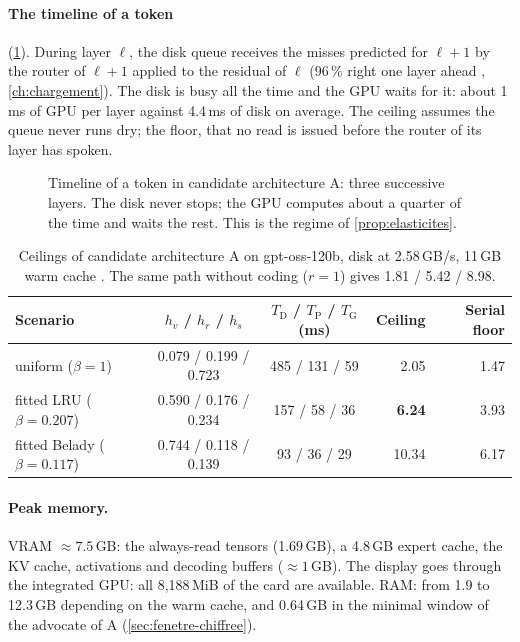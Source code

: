 \paragraph{The timeline of a token} (\cref{fig:chrono-a}). During layer $\ell$, the disk queue receives the misses predicted for $\ell+1$ by the router of $\ell+1$ applied to the residual of $\ell$ (96\,\% right one layer ahead \litt, \cref{ch:chargement}). The disk is busy all the time and the GPU waits for it: about 1\,ms of GPU per layer against 4.4\,ms of disk on average. The ceiling assumes the queue never runs dry; the floor, that no read is issued before the router of its layer has spoken.

\begin{figure}[ht]
\centering
\SchemaChronoA
\caption[Timeline of a token in A]{Timeline of a token in candidate architecture A: three successive layers. The disk never stops; the GPU computes about a quarter of the time and waits the rest. This is the regime of \cref{prop:elasticites}.}
\label{fig:chrono-a}
\end{figure}

\begin{table}[ht]
\centering\small
\caption[Ceilings of A]{Ceilings of candidate architecture A on gpt-oss-120b, disk at 2.58\,GB/s, 11\,GB warm cache \calc. The same path without coding ($r = 1$) gives 1.81 / 5.42 / 8.98.}
\label{tab:plafonds-a}
\begin{tabular}{@{}lccrr@{}}
\toprule
Scenario & $h_v$ / $h_r$ / $h_s$ & $T_{\mathrm{D}}$ / $T_{\mathrm{P}}$ / $T_{\mathrm{G}}$ (ms) & Ceiling & Serial floor \\
\midrule
uniform ($\beta = 1$) & 0.079 / 0.199 / 0.723 & 485 / 131 / 59 & 2.05 & 1.47 \\
fitted LRU ($\beta = 0.207$) & 0.590 / 0.176 / 0.234 & 157 / 58 / 36 & \textbf{6.24} & 3.93 \\
fitted Belady ($\beta = 0.117$) & 0.744 / 0.118 / 0.139 & 93 / 36 / 29 & 10.34 & 6.17 \\
\bottomrule
\end{tabular}
\end{table}

\paragraph{Peak memory.} VRAM $\approx 7.5$\,GB: the always-read tensors (1.69\,GB), a 4.8\,GB expert cache, the KV cache, activations and decoding buffers ($\approx 1$\,GB). The display goes through the integrated GPU: all 8{,}188\,MiB of the card are available. RAM: from 1.9 to 12.3\,GB depending on the warm cache, and 0.64\,GB in the minimal window of the advocate of A (\cref{sec:fenetre-chiffree}).

